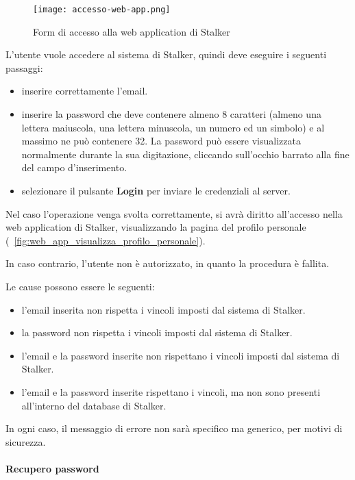 \documentclass[../manuale-utente.tex]{subfiles}
\begin{document}
\begin{figure}[H]
    \centering
    \texttt{[image: accesso-web-app.png]}
    \caption{Form di accesso alla web application di Stalker}%
    \label{fig:web_app_form_accesso}
\end{figure}

L'utente vuole accedere al sistema di Stalker, quindi deve eseguire i seguenti passaggi:
\begin{itemize}
    \item inserire correttamente l'email.
    \item inserire la password che deve contenere almeno 8 caratteri (almeno una lettera maiuscola, una lettera minuscola, un numero ed un simbolo) e al massimo ne può contenere 32. La password può essere visualizzata normalmente durante la sua digitazione, cliccando sull'occhio barrato alla fine del campo d'inserimento.
    \item selezionare il pulsante \textbf{Login} per inviare le credenziali al server.
\end{itemize}

Nel caso l'operazione venga svolta correttamente, si avrà diritto all'accesso nella web application di Stalker, visualizzando la pagina del profilo personale (~\ref{fig:web_app_visualizza_profilo_personale}).

In caso contrario, l'utente non è autorizzato, in quanto la procedura è fallita.

Le cause possono essere le seguenti:
\begin{itemize}
    \item l'email inserita non rispetta i vincoli imposti dal sistema di Stalker.
    \item la password non rispetta i vincoli imposti dal sistema di Stalker.
    \item l'email e la password inserite non rispettano i vincoli imposti dal sistema di Stalker.
    \item l'email e la password inserite rispettano i vincoli, ma non sono presenti all'interno del database di Stalker.
\end{itemize}

In ogni caso, il messaggio di errore non sarà specifico ma generico, per motivi di sicurezza.
\newpage

\paragraph{Recupero password}%
\label{par:recupero_password}
\end{document}
